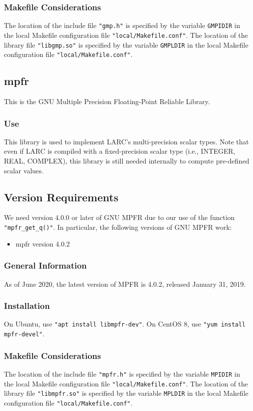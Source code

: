 \documentclass{article}
\begin{document}
\subsubsection{Makefile Considerations}
The location of the include file \texttt{"gmp.h"}
is specified by the variable \texttt{GMPIDIR} in the
local Makefile configuration file \texttt{"local/Makefile.conf"}.
The location of the library file \texttt{"libgmp.so"}
is specified by the variable \texttt{GMPLDIR} in the
local Makefile configuration file \texttt{"local/Makefile.conf"}.

\subsection{mpfr}
This is the GNU Multiple Precision Floating-Point Reliable Library.
\subsubsection{Use}
This library is used to implement LARC's multi-precision
scalar types.
Note that even if LARC is compiled with a fixed-precision
scalar type (i.e., INTEGER, REAL, COMPLEX), this library
is still needed internally to compute pre-defined scalar
values.
\subsection{Version Requirements}
We need version 4.0.0 or later of GNU MPFR due to our use of
the function {\tt "mpfr\_get\_q()"}.
In particular, the following versions of GNU MPFR work:
\begin{itemize}
\item mpfr version 4.0.2
\end{itemize}
\subsubsection{General Information}
As of June 2020, the latest version of MPFR is 4.0.2,
released January 31, 2019.
\subsubsection{Installation}
On Ubuntu, use {\tt "apt install libmpfr-dev"}.
On CentOS 8, use {\tt "yum install mpfr-devel"}.
\subsubsection{Makefile Considerations}
The location of the include file \texttt{"mpfr.h"}
is specified by the variable \texttt{MPIDIR} in the
local Makefile configuration file \texttt{"local/Makefile.conf"}.
The location of the library file \texttt{"libmpfr.so"}
is specified by the variable \texttt{MPLDIR} in the
local Makefile configuration file \texttt{"local/Makefile.conf"}.
\end{document}
